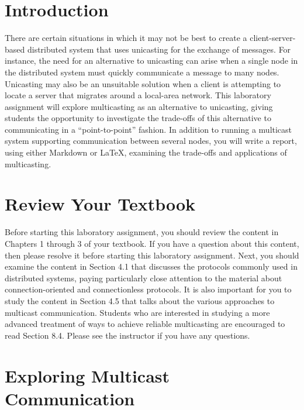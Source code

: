 

\usepackage[compact]{titlesec}



\section*{Introduction}

There are certain situations in which it may not be best to create a client-server-based distributed system that uses
unicasting for the exchange of messages. For instance, the need for an alternative to unicasting can arise when a single
node in the distributed system must quickly communicate a message to many nodes. Unicasting may also be an
unsuitable solution when a client is attempting to locate a server that migrates around a local-area network. This
laboratory assignment will explore multicasting as an alternative to unicasting, giving students the opportunity to
investigate the trade-offs of this alternative to communicating in a ``point-to-point'' fashion.  In addition to running
a multicast system supporting communication between several nodes, you will write a report, using either Markdown
or \LaTeX, examining the trade-offs and applications of multicasting.

\section*{Review Your Textbook}

Before starting this laboratory assignment, you should review the content in Chapters 1 through 3 of your textbook. If
you have a question about this content, then please resolve it before starting this laboratory assignment. Next, you
should examine the content in Section 4.1 that discusses the protocols commonly used in distributed systems, paying
particularly close attention to the material about connection-oriented and connectionless protocols. It is also
important for you to study the content in Section 4.5 that talks about the various approaches to multicast
communication. Students who are interested in studying a more advanced treatment of ways to achieve reliable
multicasting are encouraged to read Section 8.4. Please see the instructor if you have any questions.

\section*{Exploring Multicast Communication}

